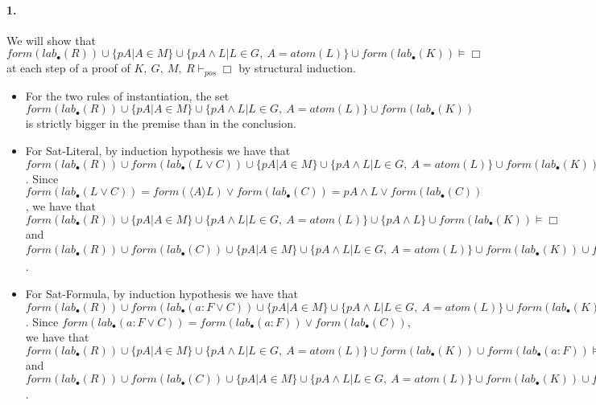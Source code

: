 \documentclass[a4paper,10pt]{report}
\newcommand{\atom}{\mathit{atom}}
\newcommand{\pos}{\vdash_\mathit{pos}}
\newcommand{\F}{\mathit{form}}
\newcommand{\T}{\mathit{lab}}
\begin{document}
\paragraph{1.}
We will show that $\F(\T_\bullet(R))\cup\{pA|A\in M\}\cup\{pA\wedge L|L\in G,\ A=\atom(L)\}
\cup\F(\T_\bullet(K))\vDash\Box$ at each step of a proof of
$K,\ G,\ M,\ R\pos\Box$ by structural induction. 
\begin{itemize}
 \item For the two rules of instantiation, the set
$\F(\T_\bullet(R))\cup\{pA|A\in M\}\cup\{pA\wedge L|L\in G,\ A=\atom(L)\}\cup\F(\T_\bullet(K))$
is strictly bigger in the premise than in the conclusion.
 \item For {\sc Sat-Literal}, by induction hypothesis we have that
$\F(\T_\bullet(R))\cup\F(\T_\bullet(L\vee C))\cup\{pA|A\in M\}\cup\{pA\wedge L|L\in G,\ A=\atom(L)\}
\cup\F(\T_\bullet(K))\vDash\Box$.
Since $\F(\T_\bullet(L\vee C))=\F(\langle A\rangle L)\vee\F(\T_\bullet(C))=
pA\wedge L\vee\F(\T_\bullet(C))$, we have that
$\F(\T_\bullet(R))\cup\{pA|A\in M\}\cup\{pA\wedge L|L\in G,\ A=\atom(L)\}
\cup\{pA\wedge L\}\cup\F(\T_\bullet(K))\vDash\Box$ and
$\F(\T_\bullet(R))\cup\F(\T_\bullet(C))\cup\{pA|A\in M\}\cup\{pA\wedge L|L\in G,\ A=\atom(L)\}
\cup\F(\T_\bullet(K))\cup\F(\T_\bullet(\overline L))\vDash\Box$.
 \item For {\sc Sat-Formula}, by induction hypothesis we have that
$\F(\T_\bullet(R))\cup\F(\T_\bullet(a:F\vee C))\cup\{pA|A\in M\}\cup\{pA\wedge L|L\in G,\ A=\atom(L)\}
\cup\F(\T_\bullet(K))\vDash\Box$.
Since $\F(\T_\bullet(a:F\vee C))=\F(\T_\bullet(a:F))\vee\F(\T_\bullet(C))$, we have that
$\F(\T_\bullet(R))\cup\{pA|A\in M\}\cup\{pA\wedge L|L\in G,\ A=\atom(L)\}
\cup\F(\T_\bullet(K))\cup\F(\T_\bullet(a:F))\vDash\Box$ and
$\F(\T_\bullet(R))\cup\F(\T_\bullet(C))\cup\{pA|A\in M\}\cup\{pA\wedge L|L\in G,\ A=\atom(L)\}
\cup\F(\T_\bullet(K))\cup\F(\T_\bullet(\downarrow\neg a:F))\vDash\Box$.
\end{itemize}
\end{document}
